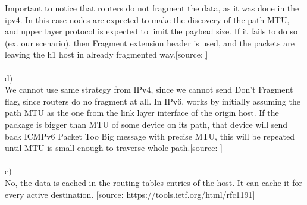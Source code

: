 \documentclass[a4paper]{article}
\begin{document}
Important to notice that routers do not fragment the data, as it was done in the ipv4. In this case nodes are expected to make the discovery of the path MTU, and upper layer protocol is expected to limit the payload size. If it fails to do so (ex. our scenario), then Fragment extension header is used, and the packets are leaving the h1 host in already fragmented way.[source: \href{https://en.wikipedia.org/wiki/IPv6_packet#Fragmentation}]\\\\
d) \\
We cannot use same strategy from IPv4, since we cannot send Don't Fragment flag, since routers do no fragment at all. In IPv6, works by initially assuming the path MTU as the one from the link layer interface of the origin host. If the package is bigger than MTU of some device on its path, that device will send back ICMPv6 Packet Too Big message with precise MTU, this will be repeated until MTU is small enough to traverse whole path.[source: \href{https://en.wikipedia.org/wiki/Path_MTU_Discovery}]\\\\
e)\\
No, the data is cached in the routing tables entries of the host. It can cache it for every active destination.  [source: https://tools.ietf.org/html/rfc1191]
\end{document}
